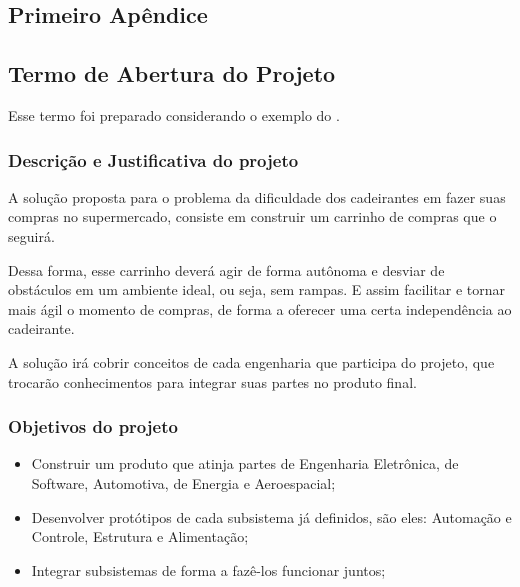 \begin{apendicesenv}

\partapendices

\chapter{Primeiro Apêndice}

\section{Termo de Abertura do Projeto}
Esse termo foi preparado considerando o exemplo do \cite{lappis_tap}.

\subsection{Descrição e Justificativa do projeto}

A solução proposta para o problema da dificuldade dos cadeirantes em fazer suas compras no supermercado, consiste em construir um carrinho de compras que o seguirá.

\par Dessa forma, esse carrinho deverá agir de forma autônoma e desviar de obstáculos em um ambiente ideal, ou seja, sem rampas. E assim facilitar e tornar mais ágil o momento de compras, de forma a oferecer uma certa independência ao cadeirante.

\par A solução irá cobrir conceitos de cada engenharia que participa do projeto, que trocarão conhecimentos para integrar suas partes no produto final. 

\subsection{Objetivos do projeto}	

\begin{itemize}  
\item Construir um produto que atinja partes de Engenharia Eletrônica, de Software, Automotiva, de Energia e Aeroespacial;
\item Desenvolver protótipos de cada subsistema já definidos, são eles: Automação e Controle, Estrutura e Alimentação;
\item Integrar subsistemas de forma a fazê-los funcionar juntos;
\end{itemize}


\end{apendicesenv}
